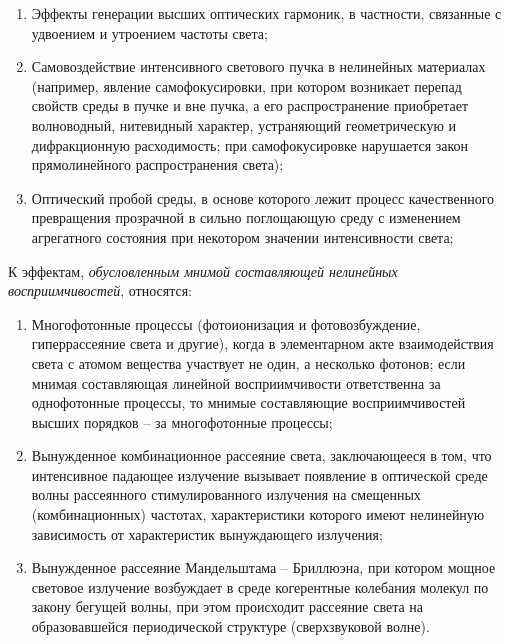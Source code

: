 \begin{enumerate}
\item  Эффекты генерации высших оптических гармоник, в частности, связанные с удвоением и утроением частоты света;
\item  Самовоздействие интенсивного светового пучка в нелинейных материалах (например, явление самофокусировки, при котором возникает перепад свойств среды в пучке и вне пучка, а его распространение приобретает волноводный, нитевидный характер, устраняющий геометрическую и дифракционную расходимость; при самофокусировке нарушается закон прямолинейного распространения света);
\item Оптический пробой среды, в основе которого лежит процесс качественного превращения прозрачной в сильно поглощающую среду с изменением агрегатного состояния при некотором значении интенсивности света;
\end{enumerate}
К эффектам, \textit{обусловленным мнимой составляющей нелинейных восприимчивостей}, относятся:
\begin{enumerate}
\item  Многофотонные процессы (фотоионизация и фотовозбуждение, гиперрассеяние света и другие), когда в элементарном акте взаимодействия света с атомом вещества участвует не один, а несколько фотонов; если мнимая составляющая линейной восприимчивости ответственна за однофотонные процессы, то мнимые составляющие восприимчивостей высших порядков – за многофотонные процессы;
\item  Вынужденное комбинационное рассеяние света, заключающееся в том, что интенсивное падающее излучение вызывает появление в оптической среде волны рассеянного стимулированного излучения на смещенных (комбинационных) частотах, характеристики которого имеют нелинейную зависимость от характеристик вынуждающего излучения;
\item Вынужденное рассеяние Мандельштама – Бриллюэна, при котором мощное световое излучение возбуждает в среде когерентные колебания молекул по закону бегущей волны, при этом происходит рассеяние света на образовавшейся периодической структуре (сверхзвуковой волне).
\end{enumerate}


